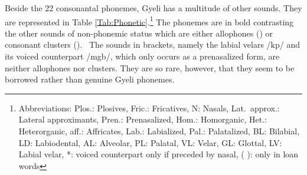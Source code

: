 Beside the 22 consonantal phonemes, Gyeli has a multitude of other sounds. They are represented in Table \ref{Tab:Phonetic}.\footnote{Abbreviations: Plos.: Plosives, Fric.: Fricatives, N: Nasals, Lat.\ approx.: Lateral approximants, Pren.: Prenasalized, Hom.: Homorganic, Het.: Heterorganic, aff.: Affricates, Lab.: Labialized, Pal.: Palatalized, BL: Bilabial, LD: Labiodental, AL: Alveolar,  PL: Palatal, VL: Velar, GL: Glottal, LV: Labial velar, *: voiced counterpart only if preceded by nasal, ( ): only in loan words} The phonemes are in bold contrasting the other sounds of non-phonemic status which are either allophones () or consonant clusters ().%
\ The sounds in brackets, namely the labial velars /kp/ and its voiced counterpart /mgb/, which only occurs as a prenasalized form, are neither allophones nor clusters. They are so rare, however, that they seem to be borrowed rather than genuine Gyeli phonemes.

